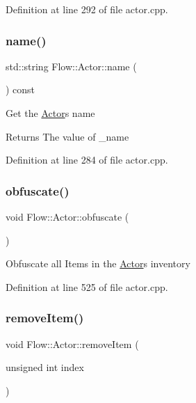 Definition at line 292 of file actor.\+cpp.

\hypertarget{class_flow_1_1_actor_a66f88663ad38508b09e53115608dd0f7}{}\label{class_flow_1_1_actor_a66f88663ad38508b09e53115608dd0f7} 
\subsubsection{\texorpdfstring{name()}{name()}\hspace{0.1cm}{\footnotesize\ttfamily [2/2]}}
{\footnotesize\ttfamily std\+::string Flow\+::\+Actor\+::name (\begin{DoxyParamCaption}{ }\end{DoxyParamCaption}) const}

Get the \hyperlink{class_flow_1_1_actor}{Actor}\textquotesingle{}s name \begin{DoxyReturn}{Returns}
The value of \+\_\+name 
\end{DoxyReturn}


Definition at line 284 of file actor.\+cpp.

\hypertarget{class_flow_1_1_actor_aea7ee4b2807325b9c4f9f394fb2c22c1}{}\label{class_flow_1_1_actor_aea7ee4b2807325b9c4f9f394fb2c22c1} 
\subsubsection{\texorpdfstring{obfuscate()}{obfuscate()}}
{\footnotesize\ttfamily void Flow\+::\+Actor\+::obfuscate (\begin{DoxyParamCaption}{ }\end{DoxyParamCaption})}

Obfuscate all Items in the \hyperlink{class_flow_1_1_actor}{Actor}\textquotesingle{}s inventory 

Definition at line 525 of file actor.\+cpp.

\hypertarget{class_flow_1_1_actor_a012c1fd5768e2781aab76dea7d29d7c5}{}\label{class_flow_1_1_actor_a012c1fd5768e2781aab76dea7d29d7c5} 
\subsubsection{\texorpdfstring{remove\+Item()}{removeItem()}}
{\footnotesize\ttfamily void Flow\+::\+Actor\+::remove\+Item (\begin{DoxyParamCaption}\item[{unsigned int}]{index }\end{DoxyParamCaption})}

